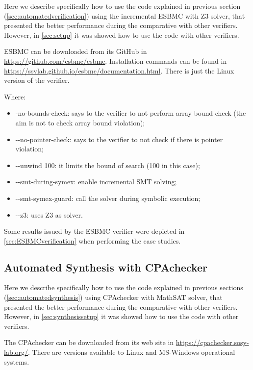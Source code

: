 Here we describe specifically how to use the code explained in previous section (\ref{sec:automatedverification}) using the incremental ESBMC with Z3 solver, that presented the better performance during the comparative with other verifiers. However, in \ref{sec:setup} it was showed how to use the code with other verifiers.

ESBMC can be downloaded from its GitHub in \url{https://github.com/esbmc/esbmc}. Installation commands can be found in \url{https://ssvlab.github.io/esbmc/documentation.html}. There is just the Linux version of the verifier.

\bigskip
{}
\bigskip

Where:
\begin{itemize}
\item -no-bounds-check: says to the verifier to not perform array bound check (the aim is not to check array bound violation);
\item -\phantom{}-no-pointer-check: says to the verifier to not check if there is pointer violation;
\item -\phantom{}-unwind 100: it limits the bound of search (100 in this case);
\item -\phantom{}-smt-during-symex: enable incremental SMT solving;
\item -\phantom{}-smt-symex-guard: call the solver during symbolic execution;
\item -\phantom{}-z3: uses Z3 as solver.
\end{itemize}

Some results issued by the ESBMC verifier were depicted in \ref{sec:ESBMCverification} when performing the case studies.


\subsection{Automated Synthesis with CPAchecker}

Here we describe specifically how to use the code explained in previous sections (\ref{sec:automatedsynthesis}) using CPAchecker with MathSAT solver, that presented the better performance during the comparative with other verifiers. However, in \ref{sec:synthesissetup} it was showed how to use the code with other verifiers.

The CPAchecker can be downloaded from its web site in \url{https://cpachecker.sosy-lab.org/}. There are versions available to Linux and MS-Windows operational systems.

